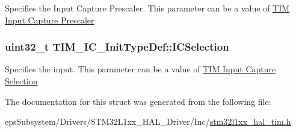 Specifies the Input Capture Prescaler. This parameter can be a value of \hyperlink{group___t_i_m___input___capture___prescaler}{T\-I\-M Input Capture Prescaler} \hypertarget{struct_t_i_m___i_c___init_type_def_aad80556490de79727ba1269c851e9724}{
\subsubsection[{I\-C\-Selection}]{\setlength{\rightskip}{0pt plus 5cm}uint32\-\_\-t T\-I\-M\-\_\-\-I\-C\-\_\-\-Init\-Type\-Def\-::\-I\-C\-Selection}}\label{struct_t_i_m___i_c___init_type_def_aad80556490de79727ba1269c851e9724}
Specifies the input. This parameter can be a value of \hyperlink{group___t_i_m___input___capture___selection}{T\-I\-M Input Capture Selection} 

The documentation for this struct was generated from the following file\-:\begin{DoxyCompactItemize}
\item 
eps\-Subsystem/\-Drivers/\-S\-T\-M32\-L1xx\-\_\-\-H\-A\-L\-\_\-\-Driver/\-Inc/\hyperlink{stm32l1xx__hal__tim_8h}{stm32l1xx\-\_\-hal\-\_\-tim.\-h}\end{DoxyCompactItemize}
